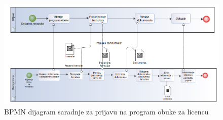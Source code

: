 \documentclass[../../main.tex]{subfiles}
\begin{document}
\newpage
\begin{figure}[!ht]
\begin{center}
\includegraphics[scale=0.45]{sections/images/bpmn_dijagram_saradnje_prijava_za_licencu.png}
\end{center}
\caption{BPMN dijagram saradnje za prijavu na program obuke za licencu}
\label{fig:kontekst}
\end{figure}
\end{document}
